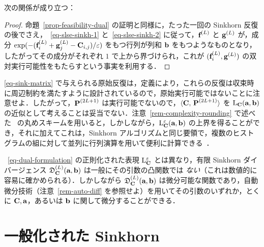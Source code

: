 \begin{prop}\label{defn-sinkhorn-div}
次の関係が成り立つ：
\end{prop}
\begin{proof}命題~\ref{prop-feasibility-dual} の証明と同様に，たった一回の Sinkhorn 反復の後でさえ，~\eqref{eq-slse-sinkh-1} と~\eqref{eq-slse-sinkh-2} に従って，$\itL{\fD}$ と $\itL{\gD}$ が，成分 $\exp(-(\itL{\fD}_i+\itL{\gD}_j-\C_{i,j})/\varepsilon)$ をもつ行列が列和 $\b$ をもつようなものとなり，したがってその成分がそれぞれ $1$ で上から界づけられ，これが $(\itL{\fD}_i,\itL{\gD})$ の双対実行可能性をもたらすという事実を利用する．
\end{proof}

\begin{rem}
\eqref{eq-sink-matrix} で与えられる原始反復は，定義により，これらの反復は収束時に周辺制約を満たすように設計されているので，原始実行可能ではないことに注意せよ．したがって，$\P^{(2L+1)}$ は実行可能でないので，$\dotp{\C}{\P^{(2L+1)}}$ を $\MKD_\C(\a,\b)$ の近似として考えることは妥当でない．注意~\ref{rem-complexity-rounding} で述べた~\citet{altschuler2017near} の丸めスキームを用いると，しかしながら，$\MKD_\C^\varepsilon(\a,\b)$ の上界を得ることができ，それに加えてこれは，Sinkhorn アルゴリズムと同じ要領で，複数のヒストグラムの組に対して並列に行列演算を用いて便利に計算できる~\citep{NIPS2018_8184}．
\end{rem}


\begin{rem} ~\eqref{eq-dual-formulation} の正則化された表現 $\MKD_\C^\varepsilon$ とは異なり，有限 Sinkhorn ダイバージェンス $\itL{\SINKHORND_\C}(\a,\b)$ は一般にその引数の凸関数では \emph{ない}（これは数値的に容易に確かめられる）．しかしながら $\itL{\SINKHORND_\C}(\a,\b)$ は微分可能な関数であり，自動微分技術（注意~\ref{rem-auto-diff} を参照せよ）を用いてその引数のいずれか，とくに $\C,\a$，あるいは $\b$ に関して微分することができる．
\end{rem}




\section{一般化された Sinkhorn}
\label{sec-generalized}

